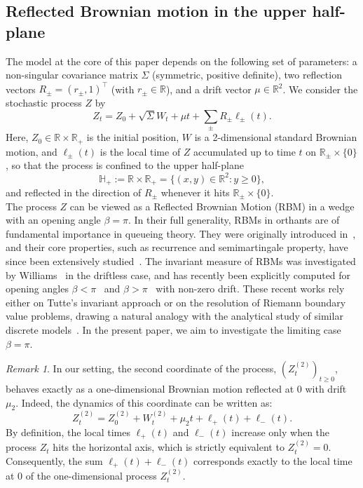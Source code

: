 \documentclass{article}
\theoremstyle{plain}
\theoremstyle{definition}
\theoremstyle{remark}
\newtheorem{remark}[theorem]{Remark}
\begin{document}
\subsection*{Reflected Brownian motion in the upper half-plane}
The model at the core of this paper depends on the following set of parameters: a non-singular covariance matrix $\Sigma$ (symmetric, positive definite), two reflection vectors $R_\pm=(r_\pm,1)^\intercal$ (with $r_\pm \in\mathbb R$), and a drift vector $\mu\in\mathbb R^2$. We consider the stochastic process $Z$ by
\begin{equation}\label{eq:trajectoires}
   Z_t=Z_0+\sqrt{\Sigma}W_t+\mu t+\sum_{\pm}R_\pm \ell_\pm(t). 
\end{equation}
Here, $Z_0\in\mathbb R\times \mathbb R_+$ is the initial position, $W$ is a 2-dimensional standard Brownian motion, and $\ell_\pm(t)$ is the local time of $Z$ accumulated up to time $t$ on $\mathbb R_\pm\times \{0\}$, so that the process is confined to the upper half-plane 
$$\mathbb H_+:=\mathbb R\times \mathbb R_+=\{(x,y)\in\mathbb R^2: y\geqslant 0\},$$
and reflected in the direction of $R_\pm$ whenever it hits $\mathbb R_\pm\times \{0\}$.\\

The process $Z$ can be viewed as a Reflected Brownian Motion (RBM) in a wedge with an opening angle $\beta=\pi$. In their full generality, RBMs in orthants are of fundamental importance in queueing theory. They were originally introduced in~\cite{Harrison_1978,Reiman_1984}, and their core properties, such as recurrence and semimartingale property, have since been extensively studied~\cite{Hobson_ROGERS_1993,Varadhan_Williams_1985a,Williams_1985}. The invariant measure of RBMs was investigated by Williams~\cite{Williams_1985b} in the driftless case, and has recently been explicitly computed for opening angles $\beta<\pi$~\cite{BoMe,dreyfus2025degeneratesystemsbrownianparticles,Franceschi_Raschel_2019} and $\beta>\pi$~\cite{threequarter,Fayolle_Franceschi_Raschel_2023} with non-zero drift. These recent works rely either on Tutte's invariant approach or on the resolution of Riemann boundary value problems, drawing a natural analogy with the analytical study of similar discrete models~\cite{livrejaune}. In the present paper, we aim to investigate the limiting case $\beta=\pi$.

\begin{remark}\label{rem:1D}
In our setting, the second coordinate of the process, $(Z_t^{(2)})_{t \ge 0}$, behaves exactly as a one-dimensional Brownian motion reflected at $0$ with drift $\mu_2$. Indeed, the dynamics of this coordinate can be written as:
\begin{equation}
    Z_t^{(2)} = Z_0^{(2)} + W_t^{(2)} + \mu_2 t + \ell_+(t) + \ell_-(t).
\end{equation}
By definition, the local times $\ell_+(t)$ and $\ell_-(t)$ increase only when the process $Z_t$ hits the horizontal axis, which is strictly equivalent to $Z_t^{(2)} = 0$. Consequently, the sum $\ell_+(t) + \ell_-(t)$ corresponds exactly to the local time at $0$ of the one-dimensional process $Z_t^{(2)}$. 
\end{remark}
\end{document}
